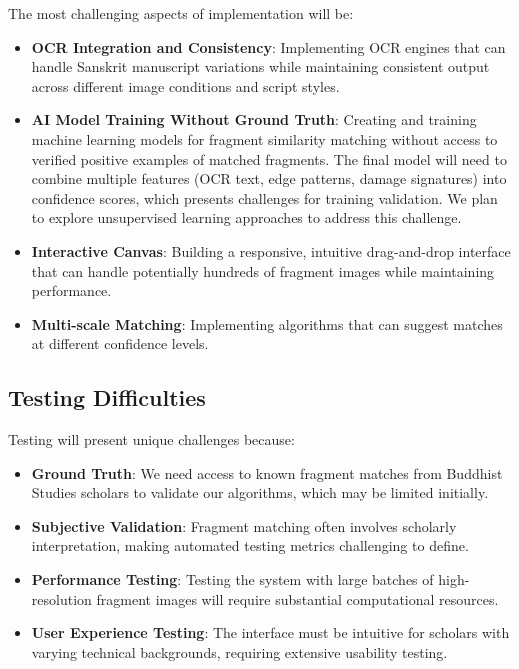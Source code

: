 \documentclass{article}
\begin{document}
The most challenging aspects of implementation will be:

\begin{itemize}
\item \textbf{OCR Integration and Consistency}: Implementing OCR engines that can handle Sanskrit manuscript variations while maintaining consistent output across different image conditions and script styles.
\item \textbf{AI Model Training Without Ground Truth}: Creating and training machine learning models for fragment similarity matching without access to verified positive examples of matched fragments. The final model will need to combine multiple features (OCR text, edge patterns, damage signatures) into confidence scores, which presents challenges for training validation. We plan to explore unsupervised learning approaches to address this challenge.
\item \textbf{Interactive Canvas}: Building a responsive, intuitive drag-and-drop interface that can handle potentially hundreds of fragment images while maintaining performance.
\item \textbf{Multi-scale Matching}: Implementing algorithms that can suggest matches at different confidence levels.
\end{itemize}

\subsection{Testing Difficulties}

Testing will present unique challenges because:

\begin{itemize}
\item \textbf{Ground Truth}: We need access to known fragment matches from Buddhist Studies scholars to validate our algorithms, which may be limited initially.
\item \textbf{Subjective Validation}: Fragment matching often involves scholarly interpretation, making automated testing metrics challenging to define.
\item \textbf{Performance Testing}: Testing the system with large batches of high-resolution fragment images will require substantial computational resources.
\item \textbf{User Experience Testing}: The interface must be intuitive for scholars with varying technical backgrounds, requiring extensive usability testing.
\end{itemize}
\end{document}
